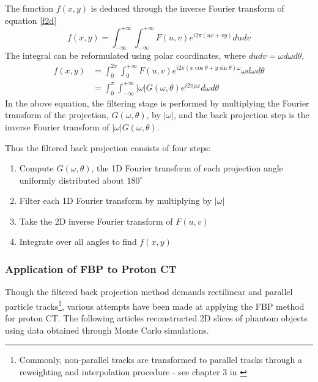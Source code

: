 \documentclass[11pt,a4paper]{article}
\begin{document}
The function $f(x,y)$ is deduced through the inverse Fourier transform of equation \ref{f2d}
\begin{equation}
f(x,y) =  \int_{-\infty}^{+\infty}\int_{-\infty}^{+\infty} F(u,v) e^{i 2 \pi (ux + vy)} du dv
\end{equation}
The integral can be reformulated using polar coordinates, where $du dv = \omega d\omega d\theta$,
\begin{align}
f(x,y) & =  \int_{0}^{2\pi} \int_0^{+\infty} F(u, v) e^{i 2\pi (x \cos \theta + y \sin \theta) \omega } \omega d\omega d\theta \\
& =  \int_{0}^{\pi} \int_{-\infty}^{+\infty} |\omega |G(\omega, \theta) e^{i 2\pi \rho \omega} d\omega d\theta 
\label{fbp}
\end{align}
In the above equation, the filtering stage is performed by multiplying the Fourier transform of the projection, $G(\omega, \theta)$, by $| \omega  |$, and the back projection step is the inverse Fourier transform of $|\omega|G(\omega, \theta)$.

Thus the filtered back projection consists of four steps:
\begin{enumerate}
\item Compute $G(\omega, \theta)$, the 1D Fourier transform of each projection angle uniformly distributed about $180^{\circ}$
\item Filter each 1D Fourier transform by multiplying by $| \omega |$
\item Take the 2D inverse Fourier transform of $F(u,v)$
\item Integrate over all angles to find $f(x,y)$
\end{enumerate}

\subsubsection{Application of FBP to Proton CT}
\label{fbpapp}
Though the filtered back projection method demands rectilinear and parallel particle tracks\footnote{Commonly, non-parallel tracks are transformed to parallel tracks through a reweighting and interpolation procedure - see chapter 3 in \cite{avinash1988principles} }, various attempts have been made at applying the FBP method for proton CT. The following articles reconstructed 2D slices of phantom objects using data obtained through Monte Carlo simulations.
\end{document}
